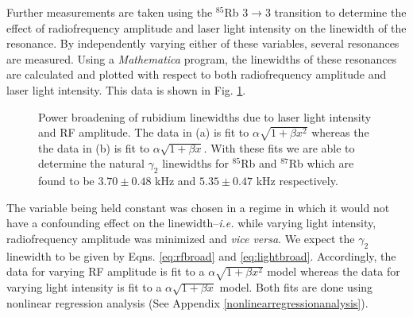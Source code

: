 Further measurements are taken using the $^{85}$Rb $3\rightarrow3$ transition to determine the effect of radiofrequency amplitude and laser light intensity on the linewidth of the resonance. By independently varying either of these variables, several resonances are measured.  Using a \emph{Mathematica} program, the linewidths of these resonances are calculated and plotted with respect to both radiofrequency amplitude and laser light intensity.  This data is shown in Fig. \ref{fig:linewidths}.
\begin{figure}[h!]
\begin{center}
\hspace{-1mm}
\vspace{-2mm}
\vspace{-2mm}
\caption{\small{Power broadening of rubidium linewidths due to laser light intensity and RF amplitude.  The data in (a) is fit to $\alpha \sqrt{1+\beta x^2}$ whereas the the data in (b) is fit to $\alpha \sqrt{1+\beta x}$.  With these fits we are able to determine the natural $\gamma_2$ linewidths for $^{85}$Rb and $^{87}$Rb which are found to be $3.70 \pm 0.48$ kHz and $5.35 \pm 0.47$ kHz respectively.}}\label{fig:linewidths}
\end{center}
\end{figure}
The variable being held constant was chosen in a regime in which it would not have a confounding effect on the linewidth--\emph{i.e.} while varying light intensity, radiofrequency amplitude was minimized and \emph{vice versa}.  We expect the $\gamma_2$ linewidth to be given by 
Eqns. \ref{eq:rfbroad} and \ref{eq:lightbroad}. Accordingly, the data for varying RF amplitude is fit to a $\alpha \sqrt{1+\beta x^2}$ model whereas the data for varying light intensity is fit to a $\alpha \sqrt{1+\beta x}$ model.  Both fits are done using nonlinear regression analysis (See Appendix \ref{nonlinearregressionanalysis}).  

